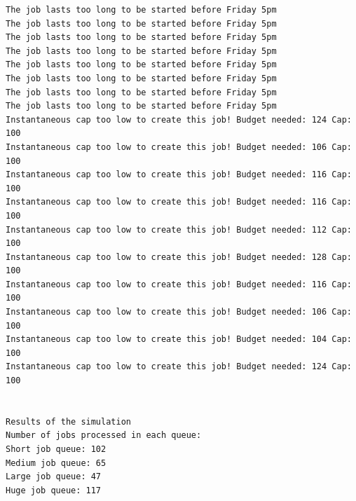 \documentclass [10 pt, a4 paper]{report}
\begin{document}
\begin{lstlisting}[caption=Output of the simulation once it is finished, label={lst:code1}, frame=single]
The job lasts too long to be started before Friday 5pm
The job lasts too long to be started before Friday 5pm
The job lasts too long to be started before Friday 5pm
The job lasts too long to be started before Friday 5pm
The job lasts too long to be started before Friday 5pm
The job lasts too long to be started before Friday 5pm
The job lasts too long to be started before Friday 5pm
The job lasts too long to be started before Friday 5pm
Instantaneous cap too low to create this job! Budget needed: 124 Cap: 100
Instantaneous cap too low to create this job! Budget needed: 106 Cap: 100
Instantaneous cap too low to create this job! Budget needed: 116 Cap: 100
Instantaneous cap too low to create this job! Budget needed: 116 Cap: 100
Instantaneous cap too low to create this job! Budget needed: 112 Cap: 100
Instantaneous cap too low to create this job! Budget needed: 128 Cap: 100
Instantaneous cap too low to create this job! Budget needed: 116 Cap: 100
Instantaneous cap too low to create this job! Budget needed: 106 Cap: 100
Instantaneous cap too low to create this job! Budget needed: 104 Cap: 100
Instantaneous cap too low to create this job! Budget needed: 124 Cap: 100


Results of the simulation
Number of jobs processed in each queue:
Short job queue: 102
Medium job queue: 65
Large job queue: 47
Huge job queue: 117


\end{lstlisting}
\end{document}
